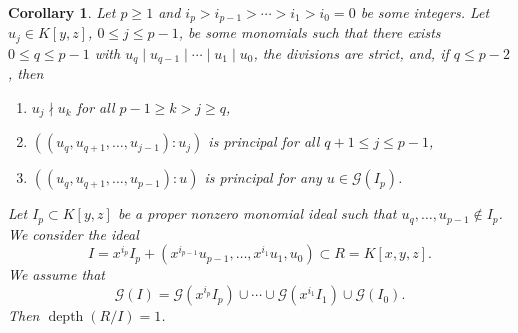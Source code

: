 \documentclass[11pt]{amsart}
\newtheorem{corollary}[theorem]{Corollary}
\def\depth{\operatorname{depth}}
\begin{document}

\begin{corollary} \label{C4}
Let $p\geq 1$ and $i_p>i_{p-1}>\cdots>i_1>i_0=0$ be some integers. Let $u_j\in K[y,z]$, $0\leq j\leq p-1$, be some monomials such that
there exists $0\leq q\leq p-1$ with $u_q\mid u_{q-1} \mid  \cdots \mid u_1 \mid u_0$, the divisions are strict, and,
if $q\leq p-2$, then
\begin{enumerate}
\item[(i)]   $u_j\nmid u_k$ for all $p-1\geq k>j\geq q$,
\item[(ii)]  $((u_{q},u_{q+1},\ldots,u_{j-1}):u_j)$ is principal  for all $q+1\leq j\leq p-1$,
\item[(iii)] $((u_{q},u_{q+1},\ldots, u_{p-1}):u)$ is principal  for any $u\in \mathcal G(I_p)$.
\end{enumerate}
Let $I_p\subset K[y,z]$ be a proper nonzero monomial ideal such that $u_q,\ldots,u_{p-1}\notin I_p$. We consider the ideal
$$I=x^{i_p}I_p+(x^{i_{p-1}}u_{p-1},\ldots,x^{i_1}u_1,u_0)\subset R=K[x,y,z].$$
We assume that \[
\mathcal{G}(I)
=
\mathcal{G}(x^{i_p}I_p)\cup\cdots\cup
\mathcal{G}(x^{i_1}I_1)\cup\mathcal{G}(I_0).
\]
Then $\depth(R/I)=1$.
\end{corollary}
\end{document}
